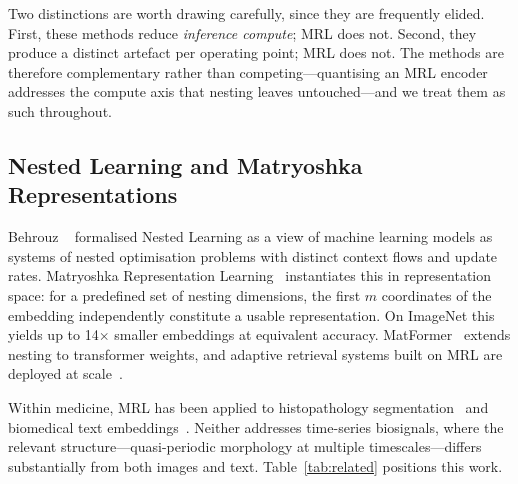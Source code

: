Two distinctions are worth drawing carefully, since they are frequently
elided. First, these methods reduce \emph{inference compute}; MRL does not.
Second, they produce a distinct artefact per operating point; MRL does not.
The methods are therefore complementary rather than competing---quantising an
MRL encoder addresses the compute axis that nesting leaves untouched---and we
treat them as such throughout.

\subsection{Nested Learning and Matryoshka Representations}

Behrouz \etal~\cite{behrouz2025} formalised Nested Learning as a view of
machine learning models as systems of nested optimisation problems with
distinct context flows and update rates. Matryoshka Representation
Learning~\cite{kusupati2022} instantiates this in representation space: for a
predefined set of nesting dimensions, the first $m$ coordinates of the
embedding independently constitute a usable representation. On ImageNet this
yields up to 14$\times$ smaller embeddings at equivalent accuracy.
MatFormer~\cite{kudugunta2023} extends nesting to transformer weights, and
adaptive retrieval systems built on MRL are deployed at
scale~\cite{kusupati2023adanns}.

Within medicine, MRL has been applied to histopathology
segmentation~\cite{golts2025} and biomedical text
embeddings~\cite{wang2024pubmedbert}. Neither addresses time-series
biosignals, where the relevant structure---quasi-periodic morphology at
multiple timescales---differs substantially from both images and text.
Table~\ref{tab:related} positions this work.


